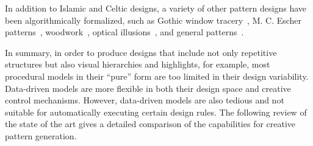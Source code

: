 In addition to Islamic and Celtic designs, a variety of other pattern designs have been algorithmically formalized, such as Gothic window tracery~\cite{havemann_2004_gpd}, M. C. Escher patterns~\cite{dunham_1981_crh,kaplan_2004_isp}, woodwork~\cite{gulati_2010_acp,gulati_2012_acp}, optical illusions~\cite{chi_2014_ois}, and general patterns~\cite{ouyang_2015_cat,gdawiec_2017_pga}.



In summary, in order to produce designs that include not only repetitive structures but also visual hierarchies and highlights, for example, most procedural models in their “pure” form are too limited in their design variability. Data-driven models are more flexible in both their design space and creative control mechanisms. However, data-driven models are also tedious and not suitable for automatically executing certain design rules. The following review of the state of the art gives a detailed comparison of the capabilities for creative pattern generation.